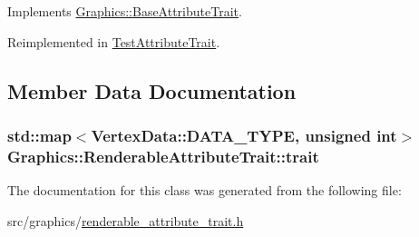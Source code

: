 Implements \hyperlink{class_graphics_1_1_base_attribute_trait_a7f43cabd619b64be1a0056e0fe568cf5}{Graphics\+::\+Base\+Attribute\+Trait}.



Reimplemented in \hyperlink{class_test_attribute_trait_af121ef5fbd5bcda4bbbc7fdadd5599c8}{Test\+Attribute\+Trait}.



\subsection{Member Data Documentation}
\hypertarget{class_graphics_1_1_renderable_attribute_trait_aa20fd62c99d1635eabe9a7fd73a67b32}{}
\subsubsection[{trait}]{\setlength{\rightskip}{0pt plus 5cm}std\+::map$<${\bf Vertex\+Data\+::\+D\+A\+T\+A\+\_\+\+T\+Y\+P\+E}, unsigned int$>$ Graphics\+::\+Renderable\+Attribute\+Trait\+::trait\hspace{0.3cm}{\ttfamily [private]}}\label{class_graphics_1_1_renderable_attribute_trait_aa20fd62c99d1635eabe9a7fd73a67b32}


The documentation for this class was generated from the following file\+:\begin{DoxyCompactItemize}
\item 
src/graphics/\hyperlink{renderable__attribute__trait_8h}{renderable\+\_\+attribute\+\_\+trait.\+h}\end{DoxyCompactItemize}
